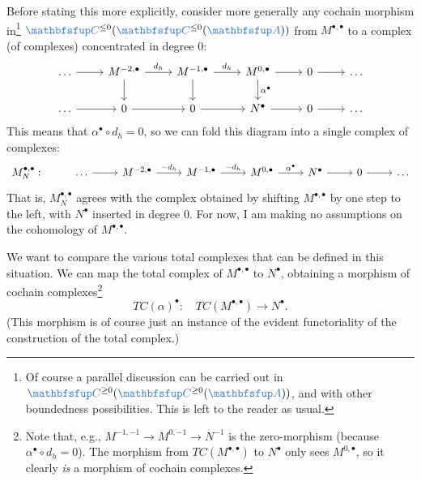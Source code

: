 Before stating this more explicitly, consider more generally any
cochain morphism in\footnote{Of course a parallel discussion can be
  carried out in $\categ{C}^{\ge 0}(\categ{C}^{\ge 0}(\categ{A}))$,
  and with other boundedness possibilities. This is left to the reader
  as usual.} $\categ{C}^{\le 0}(\categ{C}^{\le 0}(\categ{A}))$ from
$M^{\bullet,\bullet}$ to a complex (of complexes) concentrated in
degree $0$:
\[\begin{tikzcd}
    \dots \arrow[r] & M^{-2,\bullet} \arrow[r, "d_h"] \arrow[d] &
    M^{-1,\bullet} \arrow[r, "d_h"] \arrow[d] & M^{0,\bullet}
    \arrow[r]
    \arrow[d, "\alpha^\bullet"] & 0 \arrow[r] & \dots \\
    \dots \arrow[r] & 0 \arrow[r] & 0 \arrow[r] & N^\bullet \arrow[r]
    & 0 \arrow[r] & \dots
  \end{tikzcd}\] This means that $\alpha^\bullet \circ d_h = 0$, so we
can fold this diagram into a single complex of complexes:
\[\begin{tikzcd}
    M_N^{\bullet,\bullet} : & \dots \arrow[r] & M^{-2,\bullet}
    \arrow[r, "-d_h"] & M^{-1,\bullet} \arrow[r, "-d_h"] &
    M^{0,\bullet} \arrow[r, "\alpha^\bullet"] & N^\bullet \arrow[r] &
    0 \arrow[r] & \dots
  \end{tikzcd}\] That is, $M_N^{\bullet,\bullet}$ agrees with the
complex obtained by shifting $M^{\bullet,\bullet}$ by one step to the
left, with $N^\bullet$ inserted in degree $0$. For now, I am making no
assumptions on the cohomology of $M^{\bullet,\bullet}$.

We want to compare the various total complexes that can be defined in
this situation. We can map the total complex of $M^{\bullet,\bullet}$
to $N^\bullet$,
obtaining a morphism of cochain complexes\footnote{Note that, e.g.,
  $M^{-1,-1} \to M^{0,-1} \to N^{-1}$ is the zero-morphism (because
  $\alpha^\bullet \circ d_h = 0$). The morphism from
  $TC(M^{\bullet,\bullet})$ to $N^\bullet$ only sees $M^{0,\bullet}$,
  so it clearly \emph{is} a morphism of cochain complexes.}
\[
  TC(\alpha)^\bullet : \quad TC(M^{\bullet,\bullet}) \longrightarrow
  N^\bullet.
\]
(This morphism is of course just an instance of the evident
functoriality of the construction of the total complex.)

